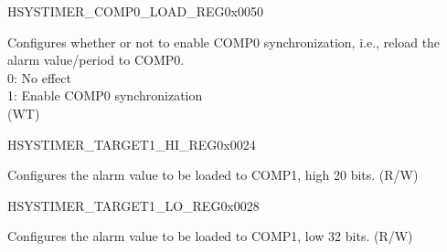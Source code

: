 \begin{register}{H}{SYSTIMER\_COMP0\_LOAD\_REG}{0x0050}\label{regdesc:SYSTIMERCOMP0LOADREG}
%
%
\regnewline%
\begin{regdesc}\begin{reglist}
\label{fielddesc:SYSTIMERTIMERCOMP0LOAD}\item [SYSTIMER\_TIMER\_COMP0\_LOAD] Configures whether or not to enable COMP0 synchronization, i.e., reload the alarm value/period to COMP0.\\
0: No effect \\
1: Enable COMP0 synchronization\\
 (WT)
\end{reglist}\end{regdesc}
\end{register}


\begin{register}{H}{SYSTIMER\_TARGET1\_HI\_REG}{0x0024}\label{regdesc:SYSTIMERTARGET1HIREG}
%
%
\regnewline%
\begin{regdesc}\begin{reglist}
\label{fielddesc:SYSTIMERTIMERTARGET1HI}\item [SYSTIMER\_TIMER\_TARGET1\_HI] Configures the alarm value to be loaded to COMP1, high 20 bits. (R/W)
\end{reglist}\end{regdesc}
\end{register}


\begin{register}{H}{SYSTIMER\_TARGET1\_LO\_REG}{0x0028}\label{regdesc:SYSTIMERTARGET1LOREG}
%
\regnewline%
\begin{regdesc}\begin{reglist}
\label{fielddesc:SYSTIMERTIMERTARGET1LO}\item [SYSTIMER\_TIMER\_TARGET1\_LO] Configures the alarm value to be loaded to COMP1, low 32 bits. (R/W)
\end{reglist}\end{regdesc}
\end{register}


